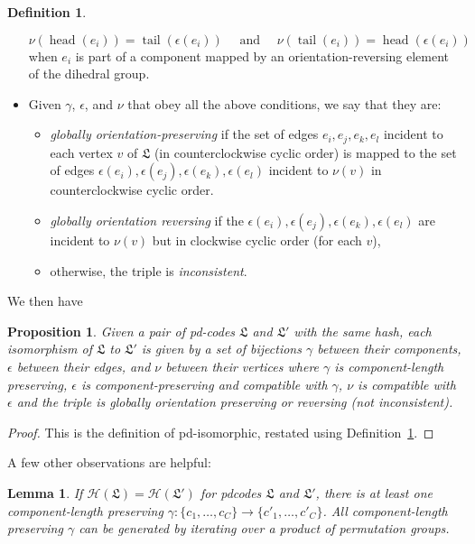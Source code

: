 \documentclass[amsmath,secnumarabic,amssymb,floatfix,nofootinbib,nobibnotes,letterpaper,11pt,tightenlines,showkeys]{revtex4}
\newtheorem{lemma}[theorem]{Lemma}
\newtheorem{proposition}[theorem]{Proposition}
\theoremstyle{definition}
\newtheorem{definition}[theorem]{Definition}
\newcommand{\head}{\operatorname{head}}
\newcommand{\tail}{\operatorname{tail}}
\let\mgp=\marginpar \marginparwidth18mm \marginparsep1mm
\def\marginpar#1{\mgp{\raggedright\tiny #1}}
\let\lbl=\label
\def\label#1{\lbl{#1}\ifinner\else\marginpar{\ref{#1} #1}\ignorespaces\fi}
\begin{document}
\begin{definition}
\begin{itemize}
\begin{equation*}
\nu(\head(e_i)) = \tail(\epsilon(e_i)) \quad \text{ and } \quad \nu(\tail(e_i)) = \head(\epsilon(e_i))
\end{equation*}
when $e_i$ is part of a component mapped by an orientation-reversing element of the dihedral group.
\item Given $\gamma$, $\epsilon$, and $\nu$ that obey all the above conditions, we say that they are:
\begin{itemize}
 \item \emph{globally orientation-preserving} if the set of edges $e_i, e_j, e_k, e_l$ incident to each vertex $v$ of $\mathfrak{L}$ (in counterclockwise cyclic order) is mapped to the set of edges $\epsilon(e_i), \epsilon(e_j), \epsilon(e_k), \epsilon(e_l)$ incident to $\nu(v)$ in counterclockwise cyclic order.
 \item \emph{globally orientation reversing} if the $\epsilon(e_i), \epsilon(e_j), \epsilon(e_k), \epsilon(e_l)$ are incident to $\nu(v)$ but in clockwise cyclic order (for each $v$),
 \item otherwise, the triple is \emph{inconsistent}.
\end{itemize}
\end{itemize}
\label{def:compatible}
\end{definition}

We then have
\begin{proposition}
Given a pair of pd-codes $\mathfrak{L}$ and $\mathfrak{L}'$ with the same hash, each isomorphism of $\mathfrak{L}$ to $\mathfrak{L}'$ is given by a set of bijections $\gamma$ between their components, $\epsilon$ between their edges, and $\nu$ between their vertices where $\gamma$ is component-length preserving, $\epsilon$ is component-preserving and compatible with $\gamma$, $\nu$ is compatible with $\epsilon$ and the triple is globally orientation preserving or reversing (not inconsistent).
\end{proposition}

\begin{proof}
This is the definition of pd-isomorphic, restated using Definition~\ref{def:compatible}.
\end{proof}

A few other observations are helpful:
\begin{lemma}
If $\mathcal{H}(\mathfrak{L}) = \mathcal{H}(\mathfrak{L}')$ for pdcodes $\mathfrak{L}$ and $\mathfrak{L}'$, there is at least one component-length preserving $\gamma : \{c_1,\dots,c_C\} \rightarrow \{c'_1,\dots,c'_C\}$. All component-length preserving $\gamma$ can be generated by iterating over a product of permutation groups.
\end{lemma}
\end{document}
